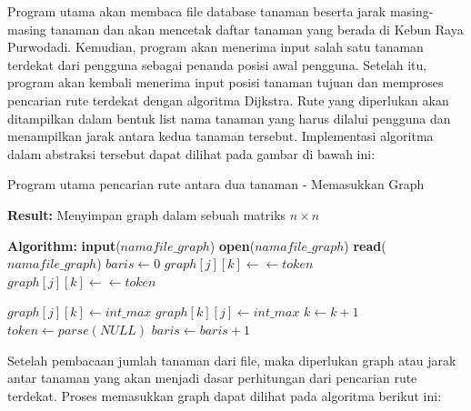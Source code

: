 \documentclass[conference]{IEEEtran}
\begin{document}
    Program utama akan membaca file database tanaman
    beserta jarak masing-masing tanaman dan akan mencetak
    daftar tanaman yang berada di Kebun Raya Purwodadi.
    Kemudian, program akan menerima input salah satu tanaman
    terdekat dari pengguna sebagai penanda posisi awal pengguna.
    Setelah itu, program akan kembali menerima input posisi
    tanaman tujuan dan memproses pencarian rute terdekat dengan
    algoritma Dijkstra. Rute yang diperlukan akan ditampilkan
    dalam bentuk list nama tanaman yang harus dilalui pengguna
    dan menampilkan jarak antara kedua tanaman tersebut.
    Implementasi algoritma dalam abstraksi tersebut dapat dilihat
    pada gambar di bawah ini:
     
\begin{algorithm}[H]
    \caption{Program utama pencarian rute antara dua tanaman - Memasukkan Graph}\label{alg:masukkangraph}
\begin{algorithmic}
    \State \textbf{Result:} Menyimpan graph dalam sebuah matriks $n \times n$

    \State \textbf{Algorithm:}
    \State \textbf{input}($namafile\_graph$)
    \State \textbf{open}($namafile\_graph$)
    \State \textbf{read}($namafile\_graph$)
    \State $baris \leftarrow 0$
        \State $graph[j][k] \leftarrow \leftarrow token$
        \State $graph[j][k] \leftarrow \leftarrow token$

            $graph[j][k] \leftarrow int\_max$                 
            $graph[k][j] \leftarrow int\_max$
        \Else
            \State $k \leftarrow k + 1$
            \State $token \leftarrow parse(NULL)$
        \EndIf
    \EndWhile
    \State $baris \leftarrow baris + 1$
\end{algorithmic}
\end{algorithm}

    Setelah pembacaan jumlah tanaman dari file, maka diperlukan graph atau jarak antar tanaman yang akan menjadi dasar
    perhitungan dari pencarian rute terdekat. Proses memasukkan
    graph dapat dilihat pada algoritma berikut ini:
\end{document}
